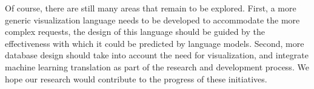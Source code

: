 \documentclass[
	a4paper, %
	10pt, %
	unnumberedsections, %
	twoside, %
]{t0003}
\begin{document}
Of course, there are still many areas that remain to be explored. First, a more generic visualization language needs to be developed to accommodate the more complex requests, the design of this language should be guided by the effectiveness with which it could be predicted by language models. Second, more database design should take into account the need for visualization, and integrate machine learning translation as part of the research and development process. We hope our research would contribute to the progress of these initiatives.





\end{document}
